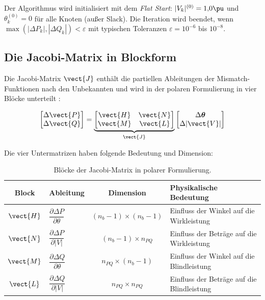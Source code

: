 Der Algorithmus wird initialisiert mit dem \textit{Flat Start}: $|V_k|^{(0)} = 1{,}0 \pu$ und $\theta_k^{(0)} = 0$ für alle Knoten (außer Slack). Die Iteration wird beendet, wenn $\max(|\Delta P_k|, |\Delta Q_k|) < \varepsilon$ mit typischen Toleranzen $\varepsilon = 10^{-6}$ bis $10^{-8}$.

\subsection{Die Jacobi-Matrix in Blockform}
\label{subsec:jacobi_polar}

Die Jacobi-Matrix $\vect{J}$ enthält die partiellen Ableitungen der Mismatch-Funktionen nach den Unbekannten und wird in der polaren Formulierung in vier Blöcke unterteilt \cite{Grainger1994}:

\begin{equation}
	\begin{bmatrix}
		\Delta \vect{P} \\
		\Delta \vect{Q}
	\end{bmatrix}
	=
	\underbrace{
		\begin{bmatrix}
			\vect{H} & \vect{N} \\
			\vect{M} & \vect{L}
		\end{bmatrix}
	}_{\vect{J}}
	\begin{bmatrix}
		\Delta \boldsymbol{\theta} \\
		\Delta |\vect{V}|
	\end{bmatrix}
	\label{eq:jacobi_block}
\end{equation}

Die vier Untermatrizen haben folgende Bedeutung und Dimension:

\begin{table}[H]
	\centering
	\caption{Blöcke der Jacobi-Matrix in polarer Formulierung.}
	\label{tab:jacobi_bloecke}
	\begin{tabular}{@{}clcl@{}}
		\toprule
		\textbf{Block} & \textbf{Ableitung} & \textbf{Dimension} & \textbf{Physikalische Bedeutung} \\
		\midrule
		$\vect{H}$ & $\dfrac{\partial \Delta P}{\partial \theta}$ & $(n_b\!-\!1) \times (n_b\!-\!1)$ & Einfluss der Winkel auf die Wirkleistung \\[10pt]
		$\vect{N}$ & $\dfrac{\partial \Delta P}{\partial |V|}$ & $(n_b\!-\!1) \times n_{PQ}$ & Einfluss der Beträge auf die Wirkleistung \\[10pt]
		$\vect{M}$ & $\dfrac{\partial \Delta Q}{\partial \theta}$ & $n_{PQ} \times (n_b\!-\!1)$ & Einfluss der Winkel auf die Blindleistung \\[10pt]
		$\vect{L}$ & $\dfrac{\partial \Delta Q}{\partial |V|}$ & $n_{PQ} \times n_{PQ}$ & Einfluss der Beträge auf die Blindleistung \\
		\bottomrule
	\end{tabular}
\end{table}

